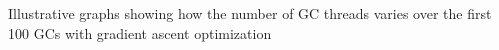 \label{fig:dynopt:illus}Illustrative graphs showing how the number of GC threads varies over the first 100 GCs with gradient ascent optimization